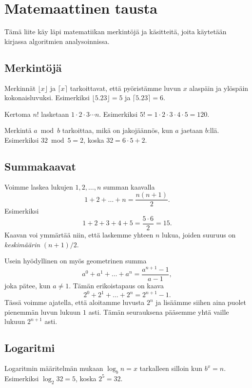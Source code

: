 \chapter{Matemaattinen tausta}

Tämä liite käy läpi matematiikan merkintöjä ja käsitteitä,
joita käytetään kirjassa algoritmien analysoinnissa.

\section*{Merkintöjä}

Merkinnät $\lfloor x \rfloor$ ja $\lceil x \rceil$ tarkoittavat,
että pyöristämme luvun $x$ alaspäin ja ylöspäin kokonaisluvuksi.
Esimerkiksi $\lfloor 5.23 \rfloor = 5$ ja $\lceil 5.23 \rceil = 6$.


Kertoma $n!$ lasketaan $1 \cdot 2 \cdot 3 \cdots n$.
Esimerkiksi $5! = 1 \cdot 2 \cdot 3 \cdot 4 \cdot 5 = 120$.


Merkintä $a \bmod b$ tarkoittaa,
mikä on jakojäännös, kun $a$ jaetaan $b$:llä.
Esimerkiksi $32 \bmod 5 = 2$, koska $32 = 6 \cdot 5 + 2$.

\section*{Summakaavat}


Voimme laskea lukujen $1,2,\dots,n$ summan kaavalla
\[1+2+\dots+n = \frac{n(n+1)}{2}.\]
Esimerkiksi
\[1+2+3+4+5 = \frac{5 \cdot 6}{2}=15.\]
Kaavan voi ymmärtää niin, että laskemme yhteen $n$ lukua,
joiden suuruus on \emph{keskimäärin} $(n+1)/2$.

Usein hyödyllinen on myös geometrinen summa
\[a^0+a^1+\dots+a^n = \frac{a^{n+1}-1}{a-1},\]
joka pätee, kun $a \neq 1$. Tämän erikoistapaus on kaava
\[2^0+2^1+\dots+2^n = 2^{n+1}-1.\]
Tässä voimme ajatella, että aloitamme luvusta $2^n$
ja lisäämme siihen aina puolet pienemmän luvun lukuun $1$ asti.
Tämän seurauksena pääsemme yhtä vaille lukuun $2^{n+1}$ asti.

\section*{Logaritmi}


Logaritmin määritelmän mukaan $\log_b n =x$
tarkalleen silloin kun $b^x=n$.
Esimerkiksi $\log_2 32=5$, koska $2^5=32$.


